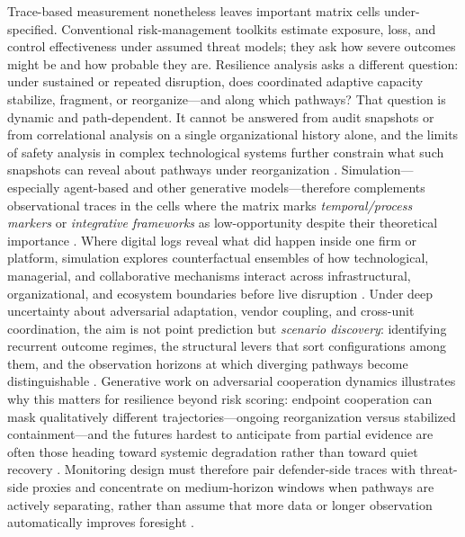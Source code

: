 Trace-based measurement nonetheless leaves important matrix cells under-specified. Conventional risk-management toolkits estimate exposure, loss, and control effectiveness under assumed threat models; they ask how severe outcomes might be and how probable they are. Resilience analysis asks a different question: under sustained or repeated disruption, does coordinated adaptive capacity stabilize, fragment, or reorganize---and along which pathways? That question is dynamic and path-dependent. It cannot be answered from audit snapshots or from correlational analysis on a single organizational history alone, and the limits of safety analysis in complex technological systems further constrain what such snapshots can reveal about pathways under reorganization \autocite{sornette2013exploring,woods2015four}. Simulation---especially agent-based and other generative models---therefore complements observational traces in the cells where the matrix marks \emph{temporal/process markers} or \emph{integrative frameworks} as low-opportunity despite their theoretical importance \autocite{macal2010tutorial,dawson2011agentbased,nan2011capturing,helbing2012agent,aerts2018integrating}. Where digital logs reveal what did happen inside one firm or platform, simulation explores counterfactual ensembles of how technological, managerial, and collaborative mechanisms interact across infrastructural, organizational, and ecosystem boundaries before live disruption \autocite{gao2016universal,krakovska2023resilience}. Under deep uncertainty about adversarial adaptation, vendor coupling, and cross-unit coordination, the aim is not point prediction but \emph{scenario discovery}: identifying recurrent outcome regimes, the structural levers that sort configurations among them, and the observation horizons at which diverging pathways become distinguishable \autocite{haasnoot2013dynamic,kwakkel2016comparing,lempert2019robust}. Generative work on adversarial cooperation dynamics illustrates why this matters for resilience beyond risk scoring: endpoint cooperation can mask qualitatively different trajectories---ongoing reorganization versus stabilized containment---and the futures hardest to anticipate from partial evidence are often those heading toward systemic degradation rather than toward quiet recovery \autocite{walker2004resilience}. Monitoring design must therefore pair defender-side traces with threat-side proxies and concentrate on medium-horizon windows when pathways are actively separating, rather than assume that more data or longer observation automatically improves foresight \autocite{francis2014metric}.

